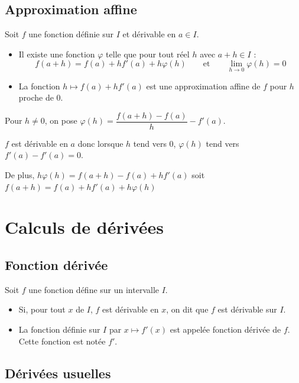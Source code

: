 \documentclass[french]{book}
\newcommand{\ds}{\displaystyle}
\newcommand{\limo}[1][x]{\ds\lim_{#1\rightarrow 0}}
\begin{document}
\subsection{Approximation affine}
\begin{prop}
Soit $f$ une fonction définie sur $I$ et dérivable en $a\in I$.
\begin{itemize}
\item Il existe une fonction $\varphi$ telle que pour tout réel $h$ avec $a+h\in I$ :
\[f(a+h)=f(a)+hf'(a)+h\varphi(h)\hspace{2em}\text{et}\hspace{2em}\limo[h]\varphi(h)=0\]
\item La fonction $h \longmapsto f(a)+hf'(a)$ est une approximation affine de $f$ pour $h$ proche de 0.
\end{itemize}
\end{prop}

\begin{demo}
Pour $h\neq 0$, on pose $\varphi(h)=\dfrac{f(a+h)-f(a)}{h}-f'(a)$.

$f$ est dérivable en $a$ donc lorsque $h$ tend vers 0, $\varphi(h)$ tend vers $f'(a)-f'(a)=0$.

De plus, $h\varphi(h)=f(a+h)-f(a)+hf'(a)$ soit $f(a+h)=f(a)+hf'(a)+h\varphi(h)$
\end{demo}

\newpage
\section{Calculs de dérivées}
\subsection{Fonction dérivée}
\begin{defn}
Soit $f$ une fonction défine sur un intervalle $I$.
\begin{itemize}
\item Si, pour tout $x$ de $I$, $f$ est dérivable en $x$, on dit que $f$ est dérivable sur $I$.
\item La fonction définie sur $I$ par $x \longmapsto f'(x)$ est appelée fonction dérivée de $f$. Cette fonction est notée $f'$.
\end{itemize}
\end{defn}

\subsection{Dérivées usuelles}
\end{document}

